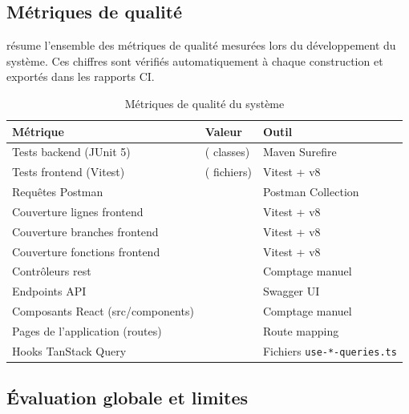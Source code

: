 \subsection{Métriques de qualité}
\label{ch5:metriques}

 résume l'ensemble des métriques de qualité mesurées lors du développement du système. Ces chiffres sont vérifiés automatiquement à chaque construction et exportés dans les rapports CI.

\begin{table}[H]
    \centering
    \small
    \begin{xltabular}{\textwidth}{lXX}
        \toprule

        \textbf{Métrique} & \textbf{Valeur} & \textbf{Outil} \\
        \midrule
        Tests backend (JUnit 5) &  ( classes) & Maven Surefire \\
        Tests frontend (Vitest) &  ( fichiers) & Vitest + v8 \\
        Requêtes Postman &  & Postman Collection \\
        Couverture lignes frontend &  & Vitest + v8 \\
        Couverture branches frontend &  & Vitest + v8 \\
        Couverture fonctions frontend &  & Vitest + v8 \\
        Contrôleurs \acrshort{rest} &  & Comptage manuel \\
        Endpoints API &  & Swagger UI \\
        Composants React (src/components) &  & Comptage manuel \\
        Pages de l'application (routes) &  & Route mapping \\
        Hooks TanStack Query &  & Fichiers \texttt{use-*-queries.ts} \\
        \bottomrule
    \end{xltabular}
    \caption{Métriques de qualité du système}
    \label{tab:metriques_qualite}
\end{table}

\subsection{Évaluation globale et limites}
\label{ch5:evaluation}

